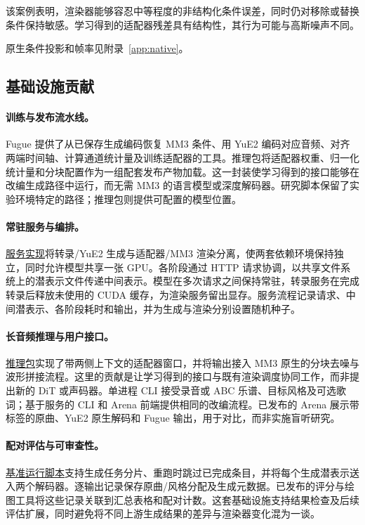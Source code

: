 \documentclass[11pt,a4paper,fontset=fandol]{ctexart}
\begin{document}
该案例表明，渲染器能够容忍中等程度的非结构化条件误差，同时仍对移除或替换条件保持敏感。学习得到的适配器残差具有结构性，其行为可能与高斯噪声不同。

原生条件投影和帧率见附录~\ref{app:native}。

\subsection{基础设施贡献}
\label{sec:infra}

\paragraph{训练与发布流水线。}Fugue 提供了从已保存生成编码恢复 MM3 条件、用 YuE2 编码对应音频、对齐两端时间轴、计算通道统计量及训练适配器的工具。推理包将适配器权重、归一化统计量和分块配置作为一组配套发布产物加载。这一封装使学习得到的接口能够在改编生成路径中运行，而无需 MM3 的语言模型或深度解码器。研究脚本保留了实验环境特定的路径；推理包则提供可配置的模型位置。

\paragraph{常驻服务与编排。}\href{https://github.com/HenryZ838978/fugue/tree/main/services}{服务实现}将转录/YuE2 生成与适配器/MM3 渲染分离，使两套依赖环境保持独立，同时允许模型共享一张 GPU。各阶段通过 HTTP 请求协调，以共享文件系统上的潜表示文件传递中间表示。模型在多次请求之间保持常驻，转录服务在完成转录后释放未使用的 CUDA 缓存，为渲染服务留出显存。服务流程记录请求、中间潜表示、各阶段耗时和输出，并为生成与渲染分别设置随机种子。

\paragraph{长音频推理与用户接口。}\href{https://github.com/HenryZ838978/fugue/tree/main/fugue}{推理包}实现了带两侧上下文的适配器窗口，并将输出接入 MM3 原生的分块去噪与波形拼接流程。这里的贡献是让学习得到的接口与既有渲染调度协同工作，而非提出新的 DiT 或声码器。单进程 CLI 接受录音或 ABC 乐谱、目标风格及可选歌词；基于服务的 CLI 和 Arena 前端提供相同的改编流程。已发布的 Arena 展示带标签的原曲、YuE2 原生解码和 Fugue 输出，用于对比，而非实施盲听研究。

\paragraph{配对评估与可审查性。}\href{https://github.com/HenryZ838978/fugue/blob/main/research/eval_gen.py}{基准运行脚本}支持生成任务分片、重跑时跳过已完成条目，并将每个生成潜表示送入两个解码器。逐输出记录保存原曲/风格分配及生成元数据。已发布的评分与绘图工具将这些记录关联到汇总表格和配对计数。这套基础设施支持结果检查及后续评估扩展，同时避免将不同上游生成结果的差异与渲染器变化混为一谈。
\end{document}
